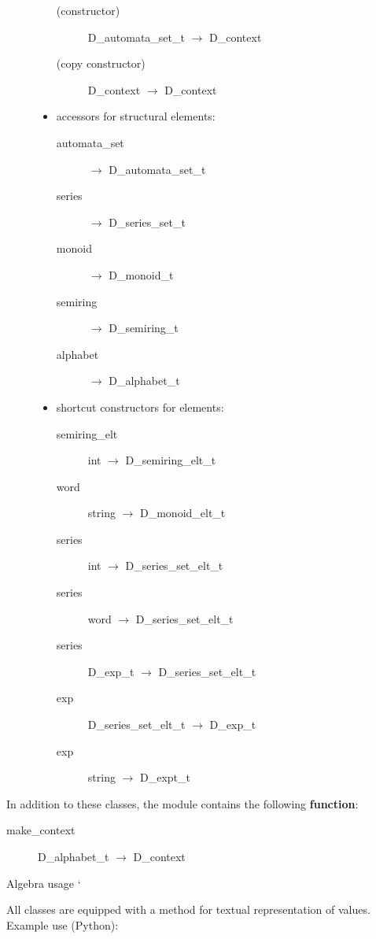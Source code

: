 \begin{description}
\begin{itemize}
\begin{description}
    \item[(constructor)] D\_automata\_set\_t $\to$ D\_context
    \item[(copy constructor)] D\_context $\to$ D\_context
    \end{description}
  \item accessors for structural elements:
    \begin{description}
    \item[automata\_set] $\to$ D\_automata\_set\_t
    \item[series] $\to$ D\_series\_set\_t
    \item[monoid] $\to$ D\_monoid\_t
    \item[semiring] $\to$ D\_semiring\_t
    \item[alphabet] $\to$ D\_alphabet\_t
    \end{description}
  \item shortcut constructors for elements:
    \begin{description}
    \item[semiring\_elt] int $\to$ D\_semiring\_elt\_t
    \item[word] string $\to$ D\_monoid\_elt\_t
    \item[series] int $\to$ D\_series\_set\_elt\_t
    \item[series] word $\to$ D\_series\_set\_elt\_t
    \item[series] D\_exp\_t $\to$ D\_series\_set\_elt\_t
    \item[exp] D\_series\_set\_elt\_t $\to$ D\_exp\_t
    \item[exp] string $\to$ D\_expt\_t
    \end{description}
  \end{itemize}  
\end{description}
       
In  addition  to these  classes,  the module  
contains the following \textbf{function}:

\begin{description}
\item[make\_context] D\_alphabet\_t $\to$ D\_context
\end{description}
  
Algebra usage
\code{}\code{}\code{}`

All classes are equipped with a  method for
textual representation of values. Example use (Python):


